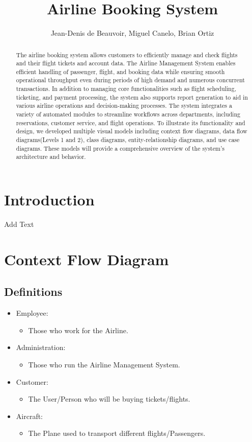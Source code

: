 \documentclass{article}
\title{Airline Booking System}
\author{Jean-Denis de Beauvoir, Miguel Canelo, Brian Ortiz}
\begin{document}
\maketitle

\begin{abstract}
The airline booking system allows customers to efficiently manage and check flights and their flight tickets and account data. 
The Airline Management System enables efficient handling of passenger, flight, and booking data while ensuring smooth operational throughput even during periods of high demand and numerous concurrent transactions. In addition to managing core functionalities such as flight scheduling, ticketing, and payment processing, the system also supports report generation to aid in various airline operations and decision-making processes. The system integrates a variety of automated modules to streamline workflows across departments, including reservations, customer service, and flight operations. To illustrate its functionality and design, we developed multiple visual models including context flow diagrams, data flow diagrams(Levels 1 and 2), class diagrams, entity-relationship diagrams, and use case diagrams. These models will provide a comprehensive overview of the system's architecture and behavior.
\end{abstract}

\section{Introduction}

Add Text

\section{Context Flow Diagram}

\subsection{Definitions}

\begin{itemize}
\item Employee:
    \begin{itemize}
    \item Those who work for the Airline.
    \end{itemize}
\item Administration:
    \begin{itemize}
    \item Those who run the Airline Management System.
    \end{itemize}
\item Customer:
    \begin{itemize}
    \item The User/Person who will be buying tickets/flights.
    \end{itemize}
\item Aircraft:
    \begin{itemize}
    \item The Plane used to transport different flights/Passengers.
    \end{itemize}
\end{itemize}
\end{document}
